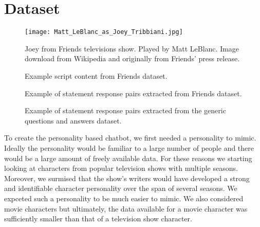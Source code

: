 \section{Dataset}
\label{sec:dataset}
\begin{figure}[t]
	\begin{center}
		\texttt{[image: Matt\_LeBlanc\_as\_Joey\_Tribbiani.jpg]}
	\end{center}
	\caption{Joey from Friends televisions show. Played by Matt LeBlanc. Image download from Wikipedia and originally from Friends' press release.}
	\label{fig:friends_data_extracted}
\end{figure}
\begin{figure}[t]
	\begin{center}
	\end{center}
	\caption{Example script content from Friends dataset.}
	\label{fig:friends_data}
\end{figure}

\begin{figure}[h]
	\begin{center}
	\end{center}
	\caption{Example of statement response pairs extracted from Friends dataset.}
	\label{fig:friends_data_extracted}
\end{figure}
\begin{figure}[h]
	\begin{center}
	\end{center}
	\caption{Example of statement response pairs extracted from the generic questions and answers dataset.}
	\label{fig:qa_data_extracted}
\end{figure}

To create the personality based chatbot, we first needed a personality to mimic. 
Ideally the personality would be familiar to a large number of people and there would be a large amount of freely available data.
For these reasons we starting looking at characters from popular television shows with multiple seasons.
Moreover, we surmised that the show's writers would have developed a strong and identifiable character personality over the span of several seasons.
We expceted such a personality to be much easier to mimic.
We also considered movie characters but ultimately, the data available for a movie character was sufficiently smaller than that of a television show character.

